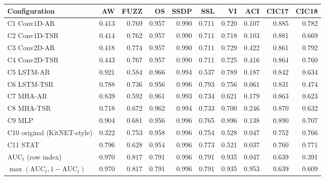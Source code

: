 \begin{table}[t]
  \centering
  \footnotesize
  \begin{tabular}{@{}lrrrrrrrrr@{}}
  \toprule
  Configuration & AW & FUZZ & OS & SSDP & SSL & VI & ACI & CIC17 & CIC18 \\
  \midrule
  C1 Conv1D-AR & 0.413 & 0.769 & 0.957 & 0.990 & 0.711 & 0.720 & 0.107 & 0.885 & 0.782 \\
  C2 Conv1D-TSR & 0.414 & 0.762 & 0.957 & 0.990 & 0.711 & 0.718 & 0.103 & 0.881 & 0.669 \\
  C3 Conv2D-AR & 0.418 & 0.774 & 0.957 & 0.990 & 0.711 & 0.729 & 0.422 & 0.861 & 0.792 \\
  C4 Conv2D-TSR & 0.443 & 0.767 & 0.957 & 0.990 & 0.711 & 0.725 & 0.416 & 0.864 & 0.760 \\
  C5 LSTM-AR & 0.921 & 0.584 & 0.966 & 0.994 & 0.537 & 0.789 & 0.187 & 0.842 & 0.634 \\
  C6 LSTM-TSR & 0.788 & 0.736 & 0.956 & 0.996 & 0.793 & 0.756 & 0.061 & 0.831 & 0.474 \\
  C7 MHA-AR & 0.839 & 0.592 & 0.961 & 0.993 & 0.734 & 0.621 & 0.179 & 0.863 & 0.623 \\
  C8 MHA-TSR & 0.718 & 0.672 & 0.962 & 0.994 & 0.733 & 0.700 & 0.246 & 0.870 & 0.632 \\
  C9 MLP & 0.904 & 0.681 & 0.956 & 0.996 & 0.765 & 0.896 & 0.138 & 0.890 & 0.707 \\
  C10 original (KitNET-style) & 0.322 & 0.753 & 0.958 & 0.996 & 0.754 & 0.528 & 0.047 & 0.752 & 0.766 \\
  C11 STAT & 0.796 & 0.628 & 0.954 & 0.996 & 0.773 & 0.521 & 0.037 & 0.760 & 0.771 \\
  \midrule
  AUC$_t$ (row index) & 0.970 & 0.817 & 0.791 & 0.996 & 0.791 & 0.935 & 0.047 & 0.639 & 0.391 \\
  $\max(\mathrm{AUC}_t, 1-\mathrm{AUC}_t)$ & 0.970 & 0.817 & 0.791 & 0.996 & 0.791 & 0.935 & 0.953 & 0.639 & 0.609 \\

\end{tabular}
\end{table}
